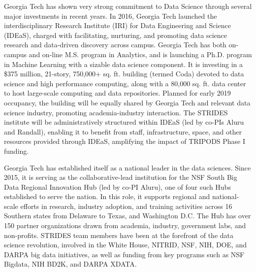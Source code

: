\documentclass[12pt]{article}
\begin{document}
Georgia Tech has shown very strong commitment to Data Science through several major investments in recent years. In 2016, Georgia Tech launched the interdisciplinary Research Institute (IRI) for Data Engineering and Science (IDEaS), charged with facilitating, nurturing, and promoting data science research and data-driven discovery across campus. Georgia Tech has both on-campus and
on-line M.S. program in Analytics, and is launching a Ph.D. program in Machine Learning with
a sizable data science component. It is investing in a \$375 million, 21-story, 750,000+ sq. ft.
building (termed Coda) devoted to data science and high performance computing, along
with a 80,000 sq. ft. data center to host large-scale computing and data repositories.
Planned for early 2019 occupancy, the building will be equally shared by Georgia Tech
and relevant data science industry, promoting academia-industry interaction. The STRIDES
institute will be administratively structured within IDEaS (led by co-PIs Aluru and Randall),
enabling it to benefit from staff, infrastructure, space, and other resources provided
through IDEaS, amplifying the impact of TRIPODS Phase I funding.

Georgia Tech has established itself as a national leader in the data sciences. Since 2015, it is serving as the collaborative-lead institution for the NSF South Big Data Regional Innovation Hub (led by co-PI Aluru),  one of four such Hubs established to serve the nation.
In this role, it supports regional and
national-scale efforts in research, industry adoption, and training activities across 16 Southern
states from Delaware to Texas, and Washington D.C. The Hub has over 150 partner organizations drawn from academia, industry, government labs, and non-profits. STRIDES team members have been at the
forefront of the data science revolution, involved in the
White House, NITRID, NSF, NIH, DOE, and DARPA big data initiatives, as well as funding from key programs such as NSF Bigdata, NIH BD2K, and DARPA XDATA.


\end{document}

